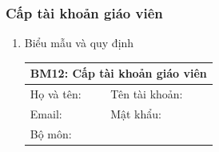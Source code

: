 \documentclass[a4paper]{article}
\begin{document}
							\subsubsection{Cấp tài khoản giáo viên}	
							\begin{enumerate}
\item Biểu mẫu và quy định

\begin{table}[H]
\centering
\renewcommand{\arraystretch}{1.5}
\setlength{\tabcolsep}{15pt}
\begin{tabular}{|p{5cm}|p{5cm}|}
\hline
\multicolumn{2}{|c|}{\textbf{BM12: Cấp tài khoản giáo viên}} \\  
\hline
Họ và tên: \dotfill  & Tên tài khoản: \dotfill \\
\hline
Email: \dotfill & Mật khẩu: \dotfill \\
\hline
Bộ môn: \dotfill & \\
\hline
\end{tabular}
\end{table}



\end{enumerate}
\end{document}
